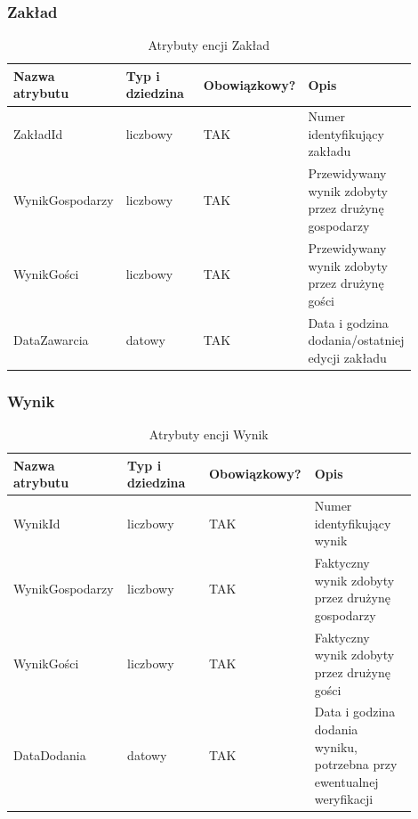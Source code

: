 \documentclass{mwrep}[15pt]
\begin{document}
\newpage

\subsubsection{Zakład}
\begin{table}[H]
	\begin{tabular}{|p{0.25\linewidth}|p{0.2\linewidth}|p{0.2\linewidth}|p{0.25\linewidth}|}
	\hline
	Nazwa atrybutu & Typ i dziedzina & Obowiązkowy? & Opis                                                           \\ \hline
	ZakładId   & liczbowy                            & TAK                              & Numer identyfikujący zakładu                                                   \\ \hline
	WynikGospodarzy         & liczbowy                           & TAK                              & Przewidywany wynik zdobyty przez drużynę gospodarzy         \\ \hline
	WynikGości          & liczbowy                            & TAK                              & Przewidywany wynik zdobyty przez drużynę gości                        \\ \hline
	DataZawarcia           & datowy                            & TAK                              & Data i godzina dodania/ostatniej edycji zakładu                 \\ \hline
	\end{tabular}
	\caption{Atrybuty encji Zakład}
\end{table}

\vspace{1cm}

\subsubsection{Wynik}
\begin{table}[H]
	\begin{tabular}{|p{0.25\linewidth}|p{0.2\linewidth}|p{0.2\linewidth}|p{0.25\linewidth}|}
	\hline
	Nazwa atrybutu & Typ i dziedzina & Obowiązkowy? & Opis                                                           \\ \hline
	WynikId   & liczbowy                            & TAK                              & Numer identyfikujący wynik                                                   \\ \hline
	WynikGospodarzy         & liczbowy                            & TAK                              & Faktyczny wynik zdobyty przez drużynę gospodarzy         \\ \hline
	WynikGości          & liczbowy                            & TAK                              & Faktyczny wynik zdobyty przez drużynę gości                        \\ \hline
	DataDodania           & datowy                            & TAK                              & Data i godzina dodania wyniku, potrzebna przy ewentualnej weryfikacji    \\ \hline
	\end{tabular}
	\caption{Atrybuty encji Wynik}
\end{table}
\end{document}

